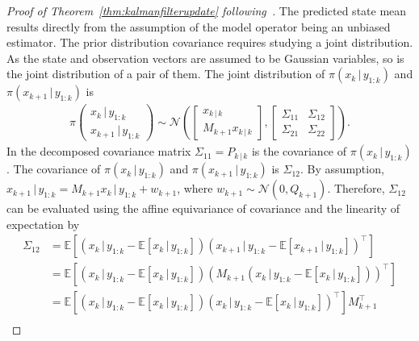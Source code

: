 \begin{proof}[Proof of Theorem~\ref{thm:kalmanfilterupdate} following~\cite{sarkka}]
    The predicted state mean results directly from the assumption of the model operator being an unbiased estimator.
    The prior distribution covariance requires studying a joint distribution.
    As the state and observation vectors are assumed to be Gaussian variables, so is the joint distribution of a pair of them.
    The joint distribution of $\pi(x_k \, \vert \, y_{1:k})$ and $\pi(x_{k+1} \, \vert \, y_{1:k})$ is
    \begin{align*}
        \pi\left( \begin{matrix}  x_k \, \vert \, y_{1:k}\\ x_{k+1} \, \vert \,  y_{1:k} \end{matrix} \right) \sim \mathcal{N}\left( \begin{bmatrix} x_{k\,\vert\,k} \\ M_{k+1} x_{k\,\vert\,k} \end{bmatrix},
          \begin{bmatrix}
              \Sigma_{11} & \Sigma_{12} \\
              \Sigma_{21} & \Sigma_{22}
          \end{bmatrix} \right).
    \end{align*}
    In the decomposed covariance matrix $\Sigma_{11} = P_{k \, \vert \, k}$ is the covariance of $\pi(x_k \, \vert \, y_{1:k})$.
    The covariance of $\pi(x_k \, \vert \, y_{1:k})$ and $\pi(x_{k+1} \, \vert \, y_{1:k})$ is $\Sigma_{12}$.
    By assumption, $x_{k+1} \, \vert \, y_{1:k} = M_{k+1} x_k \, \vert \, y_{1:k} + w_{k+1}$, where $w_{k+1} \sim \mathcal{N}(0, Q_{k+1})$.
    Therefore, $\Sigma_{12}$ can be evaluated using the affine equivariance of covariance and the linearity of expectation by
    \begin{align*}
        \Sigma_{12} &= \mathbb{E}[(x_k \, \vert \, y_{1:k} - \mathbb{E}[x_k \, \vert \, y_{1:k}])(x_{k+1} \, \vert \, y_{1:k} - \mathbb{E}[x_{k+1} \, \vert \, y_{1:k}])^{\top}]\\
                    &= \mathbb{E}[(x_k \, \vert \, y_{1:k} - \mathbb{E}[x_k \, \vert \, y_{1:k}])(M_{k+1}(x_k \, \vert \, y_{1:k} - \mathbb{E}[x_k \, \vert \, y_{1:k}]))^{\top}]\\
                    &= \mathbb{E}[(x_k \, \vert \, y_{1:k} - \mathbb{E}[x_k \, \vert \, y_{1:k}])(x_k \, \vert \, y_{1:k} - \mathbb{E}[x_k \, \vert \, y_{1:k}])^{\top}]M_{k+1}^{\top}\\

\end{align*}
\end{proof}
